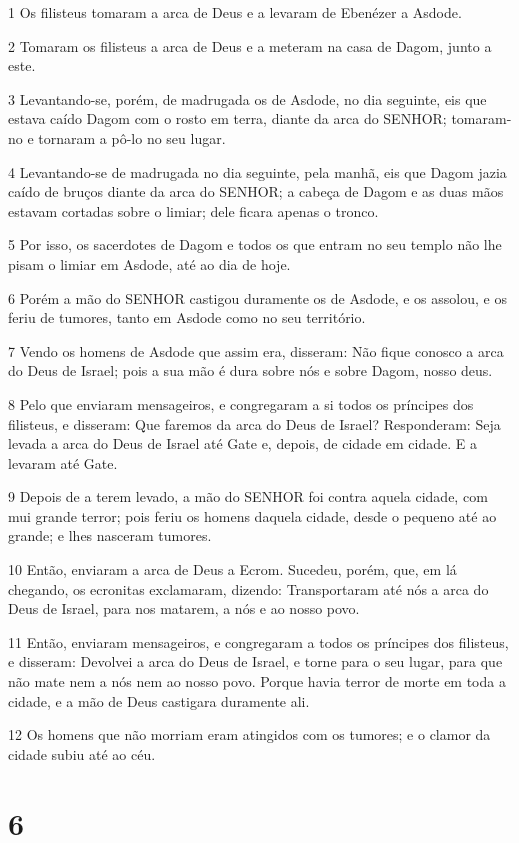 \par 1 Os filisteus tomaram a arca de Deus e a levaram de Ebenézer a Asdode.
\par 2 Tomaram os filisteus a arca de Deus e a meteram na casa de Dagom, junto a este.
\par 3 Levantando-se, porém, de madrugada os de Asdode, no dia seguinte, eis que estava caído Dagom com o rosto em terra, diante da arca do SENHOR; tomaram-no e tornaram a pô-lo no seu lugar.
\par 4 Levantando-se de madrugada no dia seguinte, pela manhã, eis que Dagom jazia caído de bruços diante da arca do SENHOR; a cabeça de Dagom e as duas mãos estavam cortadas sobre o limiar; dele ficara apenas o tronco.
\par 5 Por isso, os sacerdotes de Dagom e todos os que entram no seu templo não lhe pisam o limiar em Asdode, até ao dia de hoje.
\par 6 Porém a mão do SENHOR castigou duramente os de Asdode, e os assolou, e os feriu de tumores, tanto em Asdode como no seu território.
\par 7 Vendo os homens de Asdode que assim era, disseram: Não fique conosco a arca do Deus de Israel; pois a sua mão é dura sobre nós e sobre Dagom, nosso deus.
\par 8 Pelo que enviaram mensageiros, e congregaram a si todos os príncipes dos filisteus, e disseram: Que faremos da arca do Deus de Israel? Responderam: Seja levada a arca do Deus de Israel até Gate e, depois, de cidade em cidade. E a levaram até Gate.
\par 9 Depois de a terem levado, a mão do SENHOR foi contra aquela cidade, com mui grande terror; pois feriu os homens daquela cidade, desde o pequeno até ao grande; e lhes nasceram tumores.
\par 10 Então, enviaram a arca de Deus a Ecrom. Sucedeu, porém, que, em lá chegando, os ecronitas exclamaram, dizendo: Transportaram até nós a arca do Deus de Israel, para nos matarem, a nós e ao nosso povo.
\par 11 Então, enviaram mensageiros, e congregaram a todos os príncipes dos filisteus, e disseram: Devolvei a arca do Deus de Israel, e torne para o seu lugar, para que não mate nem a nós nem ao nosso povo. Porque havia terror de morte em toda a cidade, e a mão de Deus castigara duramente ali.
\par 12 Os homens que não morriam eram atingidos com os tumores; e o clamor da cidade subiu até ao céu.

\chapter{6}

